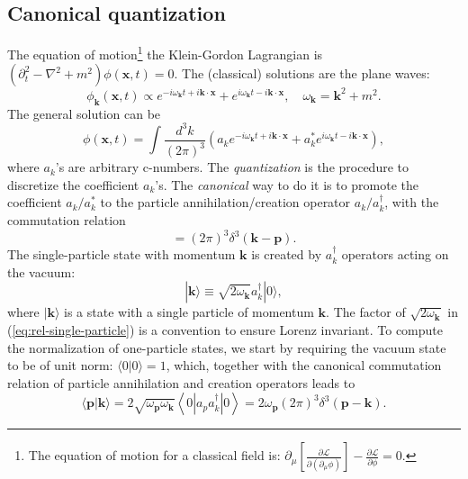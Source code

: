 \documentclass[aps,prb,superscriptaddress,nofootinbib]{revtex4}
\begin{document}
\subsection{Canonical quantization}
The equation of motion\footnote{The equation of motion for a classical field is: $\partial_\mu \left[\frac{\partial \mathcal L}{\partial(\partial_\mu \phi)}\right] - \frac{\partial \mathcal L}{\partial \phi} = 0$.} the Klein-Gordon Lagrangian is $(\partial_t^2-\nabla^2+m^2)\phi(\bm x,t) = 0$.
The (classical) solutions are the plane waves:
\begin{equation*}
	\phi_{\bm k}(\bm x, t) \propto e^{-i\omega_{\bm{k}}t+i\bm{k}\cdot\bm{x}} + e^{i\omega_{\bm{k}}t-i\bm{k}\cdot\bm{x}},\quad
	\omega_{\bm{k}}=\bm{k}^2+m^2.
\end{equation*}
The general solution can be
\begin{equation*}
	\phi(\bm x,t) = \int \frac{d^{3} k}{(2\pi)^{3}} \left(
		a_{k}e^{-i\omega_{\bm{k}}t+i\bm{k}\cdot\bm{x}} + 
		a^*_{k}e^{i\omega_{\bm{k}}t-i\bm{k}\cdot\bm{x}} 
	\right),
\end{equation*}
where $a_k$'s are arbitrary c-numbers.
The \textit{quantization} is the procedure to discretize the coefficient $a_k$'s.
The \textit{canonical} way to do it is to promote the coefficient $a_{k}/a_{k}^*$ to the particle annihilation/creation operator $a_{k}/a_{k}^\dagger$, with the commutation relation
\begin{equation}
	[a_{k}, a_{p}^\dagger] = (2\pi)^{3} \delta^{3}(\bm{k}-\bm{p}).
\end{equation}
The single-particle state with momentum $\bm k$ is created by $a_{k}^{\dagger}$ operators acting on the vacuum:
\begin{equation}
	|\bm{k}\rangle \equiv \sqrt{2\omega_{\bm k}} a_{k}^{\dagger}|0\rangle,
	\label{eq:rel-single-particle}
\end{equation}
where $|\bm{k}\rangle$ is a state with a single particle of momentum $\bm{k}$.
The factor of $\sqrt{2 \omega_{\bm k}}$ in (\ref{eq:rel-single-particle}) is a convention to ensure Lorenz invariant.
To compute the normalization of one-particle states, we start by requiring the vacuum state to be of unit norm: $\langle 0|0\rangle=1$, which, together with the canonical commutation relation of particle annihilation and creation operators leads to
\begin{equation}
	\langle\bm{p}|\bm{k}\rangle 
	= 2\sqrt{\omega_{\bm p} \omega_{\bm k}}\left\langle 0\left|a_{p} a_{k}^{\dagger}\right| 0\right\rangle
	= 2 \omega_{\bm p}(2\pi)^{3} \delta^{3}(\bm{p}-\bm{k}).
\end{equation}
\end{document}
